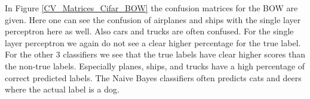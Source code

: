 \documentclass[11pt]{article}
\begin{document}
In Figure \ref{CV_Matrices_Cifar_BOW} the confusion matrices for the BOW are given. Here one can see the confusion of airplanes and ships with the single layer perceptron here as well. Also cars and trucks are often confused. For the single layer perceptron we again do not see a clear higher percentage for the true label. For the other 3 classifiers we see that the true labels have clear higher scores than the non-true labels. Especially planes, ships, and trucks have a high percentage of correct predicted labels. The Naive Bayes classifiers often predicts cats and deers where the actual label is a dog.  

\begin{figure}
\centering
{}
\hfill
{}

\end{figure}
\end{document}
